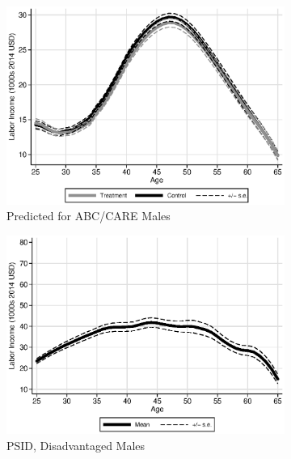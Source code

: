 \begin{figure}
\centering
\caption{Labor Income Profiles, Prediction Based on Lagged Labor Income and $\bm{B}$}\label{fig:labor-income-profiles}
\begin{subfigure}[h]{0.4\textwidth}
		\centering
		\caption{Predicted for ABC/CARE Males} \label{fig:abcare1}
		\includegraphics[width=\textwidth]{output/labor_25-60_male_3.eps}
\end{subfigure}%
\begin{subfigure}[h]{0.4\textwidth}
	\centering
	\caption{PSID, Disadvantaged Males} \label{fig:psid1}
		\includegraphics[width=\textwidth]{output/psid_incomeprofiles_s1.eps}
\end{subfigure}
\begin{subfigure}[h]{0.4\textwidth}
		\centering

\end{subfigure}
\end{figure}
